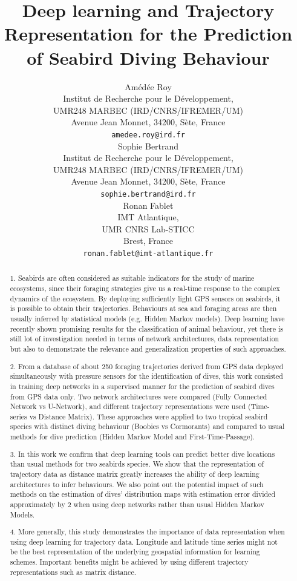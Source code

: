 \documentclass{article}
\title{Deep learning and Trajectory Representation for the Prediction of Seabird Diving Behaviour}
\author{
  Amédée Roy \\
  Institut de Recherche pour le Développement,\\
  UMR248 MARBEC (IRD/CNRS/IFREMER/UM)\\
  Avenue Jean Monnet, 34200, Sète, France \\
  \texttt{amedee.roy@ird.fr} \\
   \And
  Sophie Bertrand \\
  Institut de Recherche pour le Développement,\\
  UMR248 MARBEC (IRD/CNRS/IFREMER/UM)\\
  Avenue Jean Monnet, 34200, Sète, France \\
  \texttt{sophie.bertrand@ird.fr} \\
  \And
  Ronan Fablet \\
  IMT Atlantique,\\
  UMR CNRS Lab-STICC\\
  Brest, France \\
  \texttt{ronan.fablet@imt-atlantique.fr} \\
}
\begin{document}
\maketitle
\linenumbers
\doublespacing


\begin{abstract}

1. Seabirds are often considered as suitable indicators for the study of marine ecosystems, since their foraging strategies give us a real-time response to the complex dynamics of the ecosystem. By deploying sufficiently light GPS sensors on seabirds, it is  possible to obtain their trajectories. Behaviours at sea and foraging areas are then usually inferred by statistical models (e.g. Hidden Markov models). Deep learning have recently shown promising results for the classification of animal behaviour, yet there is still lot of investigation needed in terms of network architectures, data representation but also to demonstrate the relevance and generalization properties of such approaches.

2. From a database of about 250 foraging trajectories derived from GPS data deployed simultaneously with pressure sensors for the identification of dives, this work consisted in training deep networks in a supervised manner for the prediction of seabird dives from GPS data only. Two network architectures were compared (Fully Connected Network vs U-Network), and different trajectory representations were used (Time-series vs Distance Matrix). These approaches were applied to two tropical seabird species with distinct diving behaviour (Boobies vs Cormorants) and compared to usual methods for dive prediction (Hidden Markov Model and First-Time-Passage).

3. In this work we confirm that deep learning tools can predict better dive locations than  usual methods for two seabirds species. We show that the representation of trajectory data as distance matrix  greatly increases the ability of deep learning architectures to infer behaviours. We also point out the potential impact of such methods on the estimation of dives' distribution maps with estimation error divided approximately by 2 when using deep networks rather than usual Hidden Markov Models.

4. More generally, this study demonstrates the importance of data representation when using deep learning for trajectory data. Longitude and latitude time series might not be the best representation of the underlying geospatial information for learning schemes. Important benefits might be achieved by using different trajectory representations such as matrix distance.

\end{abstract}
\end{document}
